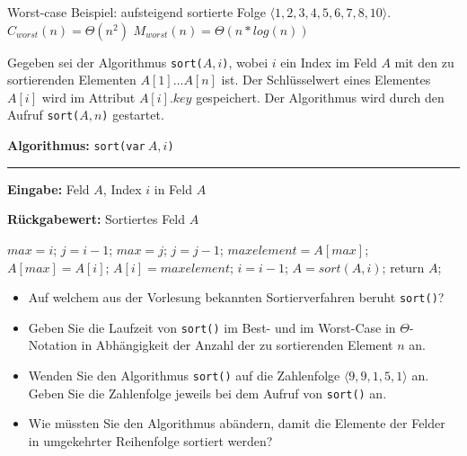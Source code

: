 \documentclass[a4paper, 12pt]{article}
\begin{document}
	
	
	
Worst-case Beispiel: aufsteigend sortierte Folge
\newline
$\langle 1,2,3,4,5,6,7,8,10  \rangle.$
\newline\newline
$C_{worst}(n)=\Theta(n^2)$ 
\newline
$M_{worst}(n)=\Theta(n*log(n))$ 




\begin{angabe}

\newcommand{\NULL}{\ensuremath{\mathtt{NULL}}}
\newcommand{\aif}{\ensuremath{\mathbf{if}}}
\newcommand{\ret}{\ensuremath{\mathbf{return}}}

Gegeben sei der Algorithmus \texttt{sort(}$A,i$\texttt),
wobei $i$ ein Index im Feld $A$ mit den zu sortierenden Elementen
$A[1] \ldots A[n]$ ist. Der Schlüsselwert eines Elementes $A[i]$ wird
im Attribut $A[i].key$ gespeichert.
Der Algorithmus wird durch den Aufruf \texttt{sort(}$A,n$\texttt)
gestartet.

\bigskip

\begin{minipage}{8.5cm}
\textbf{Algorithmus:} \texttt{sort(var}$~A,i$\texttt)
\hrule
\begin{algorithmic}
\item[\textbf{Eingabe:}] Feld $A$, Index $i$ in Feld $A$
\item[\textbf{Rückgabewert:}] Sortiertes Feld $A$
\item[{}]
	    \ZEILE $max = i$;
	    \ZEILE $j=i-1$;
		  \ZEILE $max=j$;
	      \ENDFALLS
	      \ZEILE $j=j-1$;
	    \ENDSOLANGE
	    \ZEILE $maxelement = A[max]$;
	    \ZEILE $A[max] = A[i]$;
	    \ZEILE $A[i] = maxelement$; 
	    \ZEILE $i = i -1$;
	    \ZEILE $A = sort(A,i)$;
	\ENDFALLS
	\ZEILE return $A$;

\end{algorithmic}
\end{minipage}
\begin{minipage}{6.5cm}
\begin{itemize}
\item Auf welchem aus der Vorlesung bekannten Sortierverfahren
	beruht \texttt{sort()}?


\item
Geben Sie die Laufzeit von \texttt{sort()} im Best- und im Worst-Case in
$\Theta$-Notation in Abhängigkeit der Anzahl der zu sortierenden Element
$n$ an.

\item
Wenden Sie den Algorithmus \texttt{sort()} auf die Zahlenfolge 
$\langle 9, 9, 1, 5, 1\rangle$ an. Geben Sie die Zahlenfolge jeweils bei
dem Aufruf von \texttt{sort()} an.

\item
Wie müssten Sie den Algorithmus abändern, damit die Elemente der
Felder in umgekehrter Reihenfolge sortiert werden?
\end{itemize} 
\end{minipage}

\end{angabe}
\end{document}

